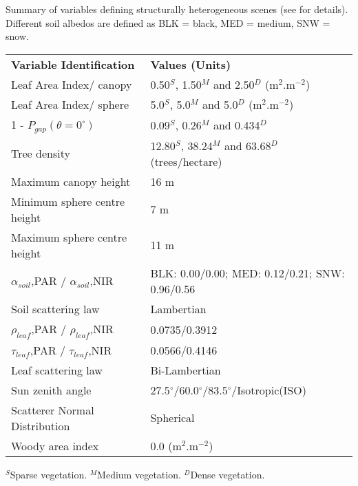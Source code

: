 \documentclass[a4paper,11pt]{report}
\begin{document}
\begin{threeparttable}
\centering
\caption{Summary of variables defining structurally heterogeneous scenes (see \citet{Widlowski2011} for details). Different soil albedos are defined as BLK = black, MED = medium, SNW = snow.}
\begin{tabular}{l{} l{}}
     \hline
     \hline
\textbf{Variable Identification}   & \textbf{Values (Units)}\\
\noalign{\smallskip}\hline
Leaf Area Index/ canopy	                & 0.50$^S$, 1.50$^M$ and 2.50$^D$ (m$^2$.m$^{-2}$)\\
Leaf Area Index/ sphere	                & 5.0$^S$, 5.0$^M$ and 5.0$^D$  (m$^2$.m$^{-2}$)\\
1 - $P_{gap} (\theta = 0^{\circ})$      & 0.09$^S$, 0.26$^M$ and 0.434$^D$\\
Tree density                            & 12.80$^S$, 38.24$^M$ and 63.68$^D$ (trees/hectare)\\
Maximum canopy height                   & 16 m\\
Minimum sphere centre height	        & 7 m\\
Maximum sphere centre height	        & 11 m\\
$\alpha_{soil}$,PAR / $\alpha_{soil}$,NIR	& BLK: 0.00/0.00; MED: 0.12/0.21; SNW: 0.96/0.56\\
Soil scattering law	                & Lambertian\\
$\rho_{leaf}$,PAR / $\rho_{leaf}$,NIR     & 0.0735/0.3912\\
$\tau_{leaf}$,PAR / $\tau_{leaf}$,NIR     & 0.0566/0.4146\\
Leaf scattering law                     & Bi-Lambertian\\
Sun zenith angle	                & 27.5$^{\circ}$/60.0$^{\circ}$/83.5$^{\circ}$/Isotropic(ISO)\\
Scatterer Normal Distribution           & Spherical\\
Woody area index                        & 0.0 (m$^2$.m$^{-2}$)\\
\hline
\hline%
\end{tabular}
\begin{tablenotes}
      \small
      \item $^S$Sparse vegetation. $^M$Medium vegetation. $^D$Dense vegetation. 
\end{tablenotes}
\label{tab:RAMI4PILPS}
\end{threeparttable}
\bigskip
\end{document}
